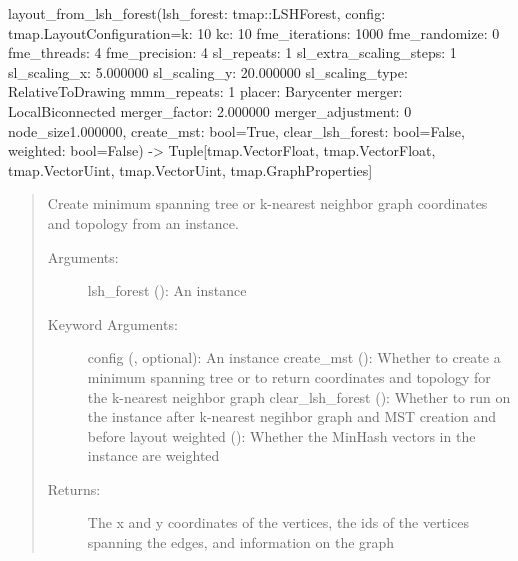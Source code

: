 \documentclass[letterpaper,10pt,english]{sphinxmanual}
\begin{document}
\begin{fulllineitems}
\label{\detokenize{documentation:tmap.layout_from_lsh_forest}}
layout\_from\_lsh\_forest(lsh\_forest: tmap::LSHForest, config: tmap.LayoutConfiguration=k: 10
kc: 10
fme\_iterations: 1000
fme\_randomize: 0
fme\_threads: 4
fme\_precision: 4
sl\_repeats: 1
sl\_extra\_scaling\_steps: 1
sl\_scaling\_x: 5.000000
sl\_scaling\_y: 20.000000
sl\_scaling\_type: RelativeToDrawing
mmm\_repeats: 1
placer: Barycenter
merger: LocalBiconnected
merger\_factor: 2.000000
merger\_adjustment: 0
node\_size1.000000, create\_mst: bool=True, clear\_lsh\_forest: bool=False, weighted: bool=False) -\textgreater{} Tuple{[}tmap.VectorFloat, tmap.VectorFloat, tmap.VectorUint, tmap.VectorUint, tmap.GraphProperties{]}
\begin{quote}

Create minimum spanning tree or k-nearest neighbor graph coordinates and topology from an {\hyperref[\detokenize{documentation:tmap.LSHForest}]{}} instance.
\begin{description}
\item[{Arguments:}] \leavevmode
lsh\_forest ({\hyperref[\detokenize{documentation:tmap.LSHForest}]{}}): An {\hyperref[\detokenize{documentation:tmap.LSHForest}]{}} instance

\item[{Keyword Arguments:}] \leavevmode
config ({\hyperref[\detokenize{documentation:tmap.LayoutConfiguration}]{}}, optional): An {\hyperref[\detokenize{documentation:tmap.LayoutConfiguration}]{}} instance
create\_mst (): Whether to create a minimum spanning tree or to return coordinates and topology for the k-nearest neighbor graph
clear\_lsh\_forest (): Whether to run  on the {\hyperref[\detokenize{documentation:tmap.LSHForest}]{}} instance after k-nearest negihbor graph and MST creation and before layout
weighted (): Whether the MinHash vectors in the {\hyperref[\detokenize{documentation:tmap.LSHForest}]{}} instance are weighted

\item[{Returns:}] \leavevmode
{} The x and y coordinates of the vertices, the ids of the vertices spanning the edges, and information on the graph

\end{description}
\end{quote}

\end{fulllineitems}
\end{document}
